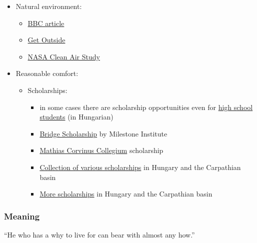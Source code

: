 \documentclass{article}
\begin{document}
\begin{itemize}
\begin{itemize}
\begin{itemize}
            \item \href{https://www.youtube.com/user/sexplanations/playlists}{Sexplanations} with Dr. Lindsey Doe
        \end{itemize}
    \end{itemize}
    \item Natural environment:
    \begin{itemize}
        \item \href{https://web.archive.org/web/20200312115636/http://www.bbc.com/earth/story/20160420-how-nature-is-good-for-our-health-and-happiness}{BBC article}
        \item \href{https://freshairfridays.co.uk/get-outside/}{Get Outside}
        \item \href{https://en.wikipedia.org/wiki/NASA_Clean_Air_Study}{NASA Clean Air Study}
    \end{itemize}
    \item Reasonable comfort:
    \begin{itemize}
        \item Scholarships:
        \begin{itemize}
            \item in some cases there are scholarship opportunities even for \href{https://eduline.hu/kozoktatas/Kozepiskolaskent_is_kaphatsz_osztondijat_VZXL0D}{high school students} (in Hungarian)
            \item \href{https://milestone-institute.org/en/bridge-scholarship-application-confirmation/}{Bridge Scholarship} by Milestone Institute
            \item \href{https://feliratkozas.mcc.hu/hu/osztondijprogram-kozepiskolas-diakok-szamara}{Mathias Corvinus Collegium} scholarship
            \item \href{https://palyazatmenedzser.hu/cimke/osztondijak/}{Collection of various scholarships} in Hungary and the Carpathian basin
            \item \href{https://pafi.hu/palyazatok?search=osztondij}{More scholarships} in Hungary and the Carpathian basin
        \end{itemize}
    \end{itemize}
\end{itemize}

\subsubsection{Meaning}

\vspace{1cm}
{``He who has a why to live for can bear with almost any how.''
\\[5pt]
}
\end{document}

